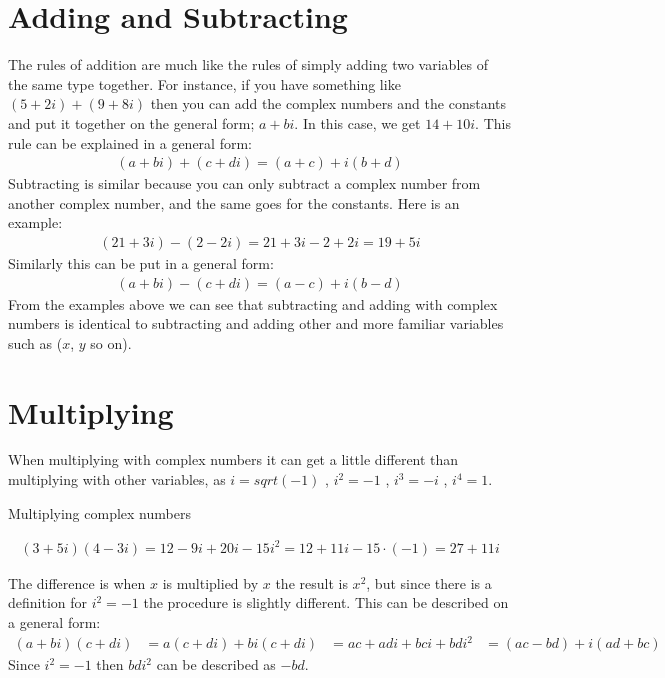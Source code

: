 \section{Adding and Subtracting}
The rules of addition are much like the rules of simply adding two variables of the same type together. For instance, if you have something like $(5+2i)+(9+8i)$ then you can add the complex numbers and the constants and put it together on the general form; $a+bi$. In this case, we get $14+10i$. This rule can be explained in a general form: 
\begin{align*}
(a + bi) + (c + di) = (a + c) + i(b + d)
\end{align*}
Subtracting is similar because you can only subtract a complex number from another complex number, and the same goes for the constants. Here is an example:
\begin{align*}
(21 + 3i) - (2 - 2i) = 21 + 3i - 2 + 2i = 19 + 5i
\end{align*}
Similarly this can be put in a general form:
\begin{align*}
(a + bi) - (c + di) = (a - c) + i(b - d)
\end{align*}
From the examples above we can see that subtracting and adding with complex numbers is identical to subtracting and adding other and more familiar variables such as ($x$, $y$ so on).

\section{Multiplying}
When multiplying with complex numbers it can get a little different than multiplying with other variables, as $i=sqrt(-1)$ , $i^2=-1$ , $i^3=-i$ , $i^4=1$. \\
\begin{example}{Multiplying complex numbers}{}

\begin{align*}
(3+5i)(4-3i) = 12 - 9i + 20i - 15i^2 = 12 + 11i - 15 \cdot (-1) = 27 + 11i
\end{align*}
\end{example}
The difference is when $x$ is multiplied by $x$ the result is $x^2$, but since there is a definition for $i^2=-1$ the procedure is slightly different. 
This can be described on a general form:
\begin{align}
(a + bi)(c + di) &= a(c + di) + bi(c + di)
&= ac + adi + bci + bdi^2
&= (ac - bd) + i(ad + bc)
\end{align}
Since $i^2 = -1$ then $bdi^2$ can be described as $-bd$.



